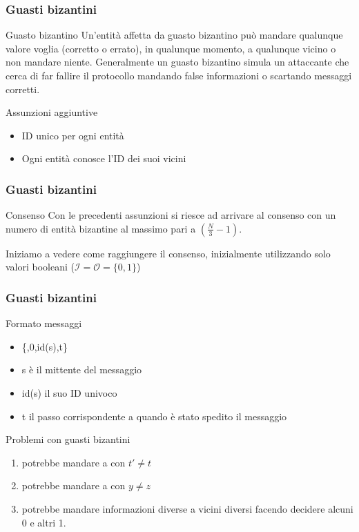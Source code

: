 		\begin{frame}
			\frametitle{Guasti bizantini}	
			\begin{block}{Guasto bizantino}
				Un'entità affetta da guasto bizantino può mandare qualunque valore voglia (corretto o errato), in qualunque momento, a qualunque vicino o non mandare niente.				
				Generalmente un guasto bizantino simula un attaccante che cerca di far fallire il protocollo mandando false informazioni o scartando messaggi corretti.
			\end{block}
			\begin{block}{Assunzioni aggiuntive}
				\begin{itemize}
					\item ID unico per ogni entità
					\item Ogni entità conosce l'ID dei suoi vicini
				\end{itemize}
			\end{block}
		\end{frame}
	
		\begin{frame}
			\frametitle{Guasti bizantini}	
			\begin{block}{Consenso}
				Con le precedenti assunzioni si riesce ad arrivare al consenso con un numero di entità bizantine al massimo pari a $(\frac{N}{3}-1)$.
			\end{block}
			Iniziamo a vedere come raggiungere il consenso, inizialmente utilizzando solo valori booleani ($\mathcal{I}=\mathcal{O}=\{0,1\}$)
		\end{frame}
	
		\begin{frame}
			\frametitle{Guasti bizantini}	
			\begin{block}{Formato messaggi}
				\begin{itemize}
					\item \{\textbullet,0,id(s),t\}
					\item s è il mittente del messaggio
					\item id(s) il suo ID univoco
					\item t il passo corrispondente a quando è stato spedito il messaggio
				\end{itemize}
			\end{block} 
			\begin{block}{Problemi con guasti bizantini}
				\begin{enumerate}
					\item \guasta potrebbe mandare  a \nguasta con $t'\neq t$
					\item \guasta potrebbe mandare  a \nguasta con $y \neq z$
					\item \guasta potrebbe mandare informazioni diverse a vicini diversi facendo decidere alcuni 0 e altri 1.
				\end{enumerate}
			\end{block}
		\end{frame}	
		
